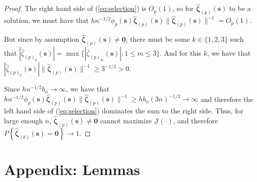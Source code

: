 \documentclass[authoryear,review, 12pt]{elsarticle}
\begin{document}
\begin{proof}
The right hand side of (\ref{eq:selection}) is $O_{p}(1)$, so for
$\hat{\bm{\zeta}}_{(p)}(\bm{s})$ to be a solution, we must have that
$hn^{-1/2}\phi_{p}(\bm{s})\hat{\bm{\zeta}}_{(p)}(\bm{s})\|\hat{\bm{\zeta}}_{(p)}(\bm{s})\|^{-1}=O_{p}\left(1\right)$.

But since by assumption $\hat{\bm{\zeta}}_{(p)}(\bm{s})\ne\bm{0}$,
there must be some $k\in\{1,2,3\}$ such that $|\hat{\zeta}_{(p)_{k}}(\bm{s})|=\max\{|\hat{\zeta}_{(p)_{m}}(\bm{s})|:1\le m\le3\}$.
And for this $k$, we have that $|\hat{\zeta}_{(p)_{k}}(\bm{s})|\|\hat{\bm{\zeta}}_{(p)}(\bm{s})\|^{-1}\ge3^{-1/2}>0$.

Since $hn^{-1/2}b_{n}\to\infty$, we have that $hn^{-1/2}\phi_{p}(\bm{s})\hat{\bm{\zeta}}_{(p)}(\bm{s})\|\hat{\bm{\zeta}}_{(p)}(\bm{s})\|^{-1}\ge hb_{n}\left(3n\right)^{-1/2}\to\infty$
and therefore the left hand side of (\ref{eq:selection}) dominates
the sum to the right side. Thus, for large enough $n$, $\hat{\bm{\zeta}}_{(p)}(\bm{s})\ne\bm{0}$
cannot maximize $\mathcal{J}\left(\cdot\right)$, and therefore $P\left\{ \hat{\bm{\zeta}}_{(b)}(\bm{s})=\bm{0}\right\} \to1$. 
\end{proof}

\section*{Appendix: Lemmas}
\end{document}
